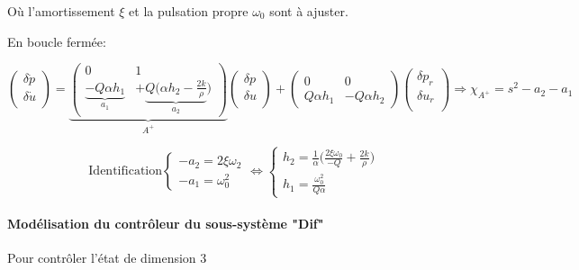 \documentclass{report}
\begin{document}
Où l'amortissement $\xi$ et la pulsation propre $\omega_0$ sont à ajuster.

En boucle fermée:

\begin{equation*}
    \begin{pmatrix}
        \delta{\dot p} \\
        \delta{\dot u} \\
    \end{pmatrix}
    =
    \underbrace{
    \begin{pmatrix}
        0 & 1 \\
        \underbrace{-Q\alpha h_1}_{a_1} & +\underbrace{Q(\alpha h_2 - \frac{2k}{\rho}}_{a_2})
    \end{pmatrix}
    }_{A^+}
    \begin{pmatrix}
        \delta{p} \\
        \delta{u} \\
    \end{pmatrix}
    +
    \begin{pmatrix}
        0 & 0 \\
        Q\alpha h_1 & -Q\alpha h_2
    \end{pmatrix}
    \begin{pmatrix}
        \delta{p_r} \\
        \delta{u_r} \\
    \end{pmatrix}
    \Rightarrow
    \chi_{A^+} = s^2 - a_2 - a_1
\end{equation*}


\begin{equation*}
    \text{Identification}
    \begin{cases}
        -a_2=2\xi \omega_2 \\
        -a_1 = \omega_0^2
    \end{cases}
    \Leftrightarrow
    \begin{cases}
        h_2 = \frac{1}{\alpha}\big( \frac{2\xi\omega_0}{-Q}+\frac{2k}{\rho})\\
        h_1 = \frac{\omega_0^2}{Q\alpha}
    \end{cases}
\end{equation*}

\paragraph{Modélisation du contrôleur du sous-système "Dif"}
Pour contrôler l'état de dimension 3
\end{document}
